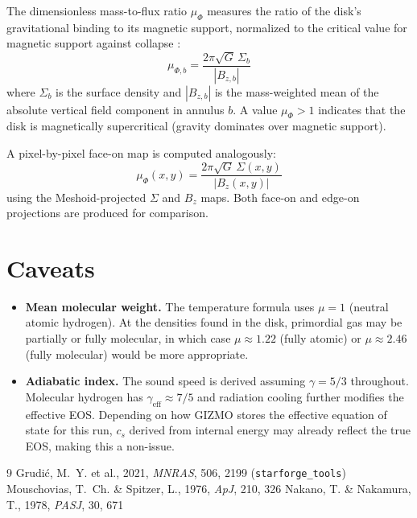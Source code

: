 \documentclass[12pt]{article}
\begin{document}
The dimensionless mass-to-flux ratio $\mu_\Phi$ measures the ratio of the disk's
gravitational binding to its magnetic support, normalized to the critical value
for magnetic support against collapse \citep{mouschovias1976,nakano1978}:
\begin{equation}
    \mu_{\Phi,b} = \frac{2\pi\sqrt{G}\,\Sigma_b}{|B_{z,b}|}
\end{equation}
where $\Sigma_b$ is the surface density and $|B_{z,b}|$ is the mass-weighted mean
of the absolute vertical field component in annulus $b$. A value $\mu_\Phi > 1$
indicates that the disk is magnetically supercritical (gravity dominates over
magnetic support).

A pixel-by-pixel face-on map is computed analogously:
\begin{equation}
    \mu_\Phi(x,y) = \frac{2\pi\sqrt{G}\,\Sigma(x,y)}{|B_z(x,y)|}
\end{equation}
using the Meshoid-projected $\Sigma$ and $B_z$ maps. Both face-on and edge-on
projections are produced for comparison.


\section*{Caveats}

\begin{itemize}
    \item \textbf{Mean molecular weight.} The temperature formula uses $\mu = 1$
          (neutral atomic hydrogen). At the densities found in the disk,
          primordial gas may be partially or fully molecular, in which case
          $\mu \approx 1.22$ (fully atomic) or $\mu \approx 2.46$ (fully
          molecular) would be more appropriate.

    \item \textbf{Adiabatic index.} The sound speed is derived assuming
          $\gamma = 5/3$ throughout. Molecular hydrogen has $\gamma_\mathrm{eff}
          \approx 7/5$ and radiation cooling further modifies the effective EOS.
          Depending on how GIZMO stores the effective equation of state for this
          run, $c_s$ derived from internal energy may already reflect the true
          EOS, making this a non-issue.
\end{itemize}

\begin{thebibliography}{9}
    Grudić, M.~Y. et al., 2021, \textit{MNRAS}, 506, 2199
    (\texttt{starforge\_tools})
    Mouschovias, T.~Ch. \& Spitzer, L., 1976, \textit{ApJ}, 210, 326
    Nakano, T. \& Nakamura, T., 1978, \textit{PASJ}, 30, 671
\end{thebibliography}
\end{document}
